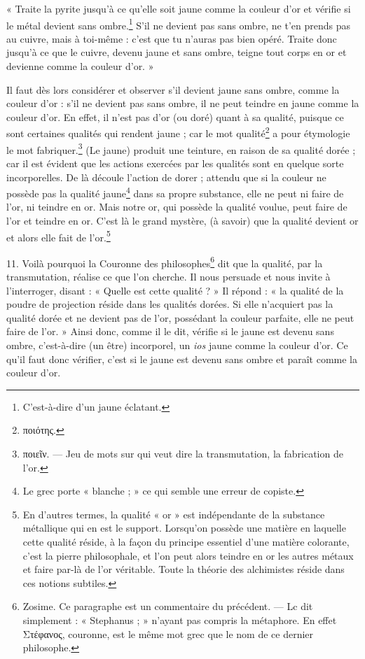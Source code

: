 \documentclass[a4paper, 11pt, oneside, polutonikogreek, french]{article}
\begin{document}
« Traite la pyrite jusqu'à ce qu'elle soit jaune comme la couleur d'or et vérifie si le métal devient sans ombre.\footnote{C'est-à-dire d'un jaune éclatant.} S'il ne devient pas sans ombre, ne t'en prends pas au cuivre, mais à toi-même : c'est que tu n'auras pas bien opéré. Traite donc jusqu'à ce que le cuivre, devenu jaune et sans ombre, teigne tout corps en or et devienne comme la couleur d'or. »

Il faut dès lors considérer et observer s'il devient jaune sans ombre, comme la couleur d'or : s'il ne devient pas sans ombre, il ne peut teindre en jaune comme la couleur d'or. En effet, il n'est pas d'or (ou doré) quant à sa qualité, puisque ce sont certaines qualités qui rendent jaune ; car le mot qualité\footnote{ποιότης.} a pour étymologie le mot fabriquer.\footnote{ποιεῖν. --- Jeu de mots sur qui veut dire la transmutation, la fabrication de l'or.} (Le jaune) produit une teinture, en raison de sa qualité dorée ; car il est évident que les actions exercées par les qualités sont en quelque sorte incorporelles. De là découle l'action de dorer ; attendu que si la couleur ne possède pas la qualité jaune\footnote{Le grec porte « blanche ; » ce qui semble une erreur de copiste.} dans sa propre substance, elle ne peut ni faire de l'or, ni teindre en or. Mais notre or, qui possède la qualité voulue, peut faire de l'or et teindre en or. C'est là le grand mystère, (à savoir) que la qualité devient or et alors elle fait de l'or.\footnote{En d'autres termes, la qualité « or » est indépendante de la substance métallique qui en est le support. Lorsqu'on possède une matière en laquelle cette qualité réside, à la façon du principe essentiel d'une matière colorante, c'est la pierre philosophale, et l'on peut alors teindre en or les autres métaux et faire par-là de l'or véritable. Toute la théorie des alchimistes réside dans ces notions subtiles.}

11. Voilà pourquoi la Couronne des philosophes\footnote{Zosime. Ce paragraphe est un commentaire du précédent. --- Lc dit simplement : « Stephanus ; » n'ayant pas compris la métaphore. En effet Στέφανος, couronne, est le même mot grec que le nom de ce dernier philosophe.} dit que la qualité, par la transmutation, réalise ce que l'on cherche. Il nous persuade et nous invite à l'interroger, disant : « Quelle est cette qualité ? » Il répond : « la qualité de la poudre de projection réside dans les qualités dorées. Si elle n'acquiert pas la qualité dorée et ne devient pas de l'or, possédant la couleur parfaite, elle ne peut faire de l'or. » Ainsi donc, comme il le dit, vérifie si le jaune est devenu sans ombre, c'est-à-dire (un être) incorporel, un \emph{ios} jaune comme la couleur d'or. Ce qu'il faut donc vérifier, c'est si le jaune est devenu sans ombre et paraît comme la couleur d'or.
\end{document}
